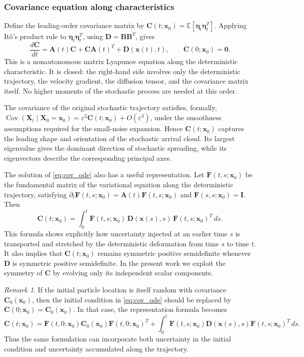 \documentclass[a4paper,11pt]{article}
\numberwithin{equation}{section}
\theoremstyle{plain}
\theoremstyle{definition}
\theoremstyle{remark}
\newtheorem{remark}[theorem]{Remark}
\newcommand{\bx}{\mathbf{x}}
\newcommand{\bX}{\mathbf{X}}
\newcommand{\bA}{\mathbf{A}}
\newcommand{\bB}{\mathbf{B}}
\newcommand{\bC}{\mathbf{C}}
\newcommand{\bD}{\mathbf{D}}
\newcommand{\bF}{\mathbf{F}}
\newcommand{\bI}{\mathbf{I}}
\newcommand{\bzero}{\mathbf{0}}
\newcommand{\etaVec}{\boldsymbol{\eta}}
\newcommand{\E}{\mathbb{E}}
\newcommand{\Cov}{\operatorname{Cov}}
\begin{document}
\subsubsection{Covariance equation along characteristics}

Define the leading-order covariance matrix by \(\bC(t;\bx_0)=\E[\etaVec_t\etaVec_t^T]\).  Applying It\^o's product rule to \(\etaVec_t\etaVec_t^T\), using \(\bD=\bB\bB^T\), gives
\begin{equation}
    \frac{d\bC}{dt}
    =
    \bA(t)\bC+\bC\bA(t)^T+\bD(\bx(t),t),
    \qquad
    \bC(0;\bx_0)=\bzero .
    \label{eq:cov_ode}
\end{equation}
This is a nonautonomous matrix Lyapunov equation along the deterministic characteristic.  It is closed: the right-hand side involves only the deterministic trajectory, the velocity gradient, the diffusion tensor, and the covariance matrix itself.  No higher moments of the stochastic process are needed at this order.

The covariance of the original stochastic trajectory satisfies, formally, \(\Cov(\bX_t\mid \bX_0=\bx_0)=\varepsilon^2\bC(t;\bx_0)+O(\varepsilon^3)\), under the smoothness assumptions required for the small-noise expansion.  Hence \(\bC(t;\bx_0)\) captures the leading shape and orientation of the stochastic arrival cloud.  Its largest eigenvalue gives the dominant direction of stochastic spreading, while its eigenvectors describe the corresponding principal axes.

The solution of \eqref{eq:cov_ode} also has a useful representation.  Let \(\bF(t,s;\bx_0)\) be the fundamental matrix of the variational equation along the deterministic trajectory, satisfying \(\partial_t\bF(t,s;\bx_0)=\bA(t)\bF(t,s;\bx_0)\) and \(\bF(s,s;\bx_0)=\bI\).  Then
\begin{equation}
    \bC(t;\bx_0)
    =
    \int_0^t
    \bF(t,s;\bx_0)\,
    \bD(\bx(s),s)\,
    \bF(t,s;\bx_0)^T\,ds .
    \label{eq:cov_representation}
\end{equation}
This formula shows explicitly how uncertainty injected at an earlier time \(s\) is transported and stretched by the deterministic deformation from time \(s\) to time \(t\).  It also implies that \(\bC(t;\bx_0)\) remains symmetric positive semidefinite whenever \(\bD\) is symmetric positive semidefinite.  In the present work we exploit the symmetry of \(\bC\) by evolving only its independent scalar components.

\begin{remark}
If the initial particle location is itself random with covariance \(\bC_0(\bx_0)\), then the initial condition in \eqref{eq:cov_ode} should be replaced by \(\bC(0;\bx_0)=\bC_0(\bx_0)\).  In that case, the representation formula becomes
\[
    \bC(t;\bx_0)
    =
    \bF(t,0;\bx_0)\bC_0(\bx_0)\bF(t,0;\bx_0)^T
    +
    \int_0^t
    \bF(t,s;\bx_0)\bD(\bx(s),s)\bF(t,s;\bx_0)^T\,ds .
\]
Thus the same formulation can incorporate both uncertainty in the initial condition and uncertainty accumulated along the trajectory.
\end{remark}
\end{document}
